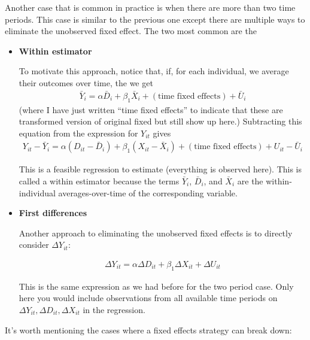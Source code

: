 \documentclass[
  letterpaper,
  DIV=11,
  numbers=noendperiod]{scrreprt}
\begin{document}
Another case that is common in practice is when there are more than two
time periods. This case is similar to the previous one except there are
multiple ways to eliminate the unobserved fixed effect. The two most
common are the

\begin{itemize}
\item
  \textbf{Within estimator}

  To motivate this approach, notice that, if, for each individual, we
  average their outcomes over time, the we get \begin{align*}
      \bar{Y}_i = \alpha \bar{D}_i + \beta_1 \bar{X}_i + (\textrm{time fixed effects}) + \bar{U}_i
    \end{align*} (where I have just written ``time fixed effects'' to
  indicate that these are transformed version of original fixed but
  still show up here.) Subtracting this equation from the expression for
  \(Y_{it}\) gives \begin{align*}
      Y_{it} - \bar{Y}_i = \alpha (D_{it} - \bar{D}_i) + \beta_1 (X_{it} - \bar{X}_i) + (\textrm{time fixed effects}) + U_{it} - \bar{U}_i
    \end{align*}

  This is a feasible regression to estimate (everything is observed
  here). This is called a within estimator because the terms
  \(\bar{Y}_i\), \(\bar{D}_i\), and \(\bar{X}_i\) are the
  within-individual averages-over-time of the corresponding variable.
\item
  \textbf{First differences}

  Another approach to eliminating the unobserved fixed effects is to
  directly consider \(\Delta Y_{it}\):

  \begin{align*}
      \Delta Y_{it} = \alpha \Delta D_{it} + \beta_1 \Delta X_{it} + \Delta U_{it}
    \end{align*}

  This is the same expression as we had before for the two period case.
  Only here you would include observations from all available time
  periods on \(\Delta Y_{it}, \Delta D_{it}, \Delta X_{it}\) in the
  regression.
\end{itemize}

It's worth mentioning the cases where a fixed effects strategy can break
down:
\end{document}
